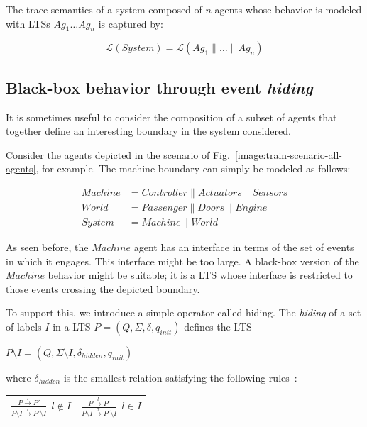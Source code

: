 The trace semantics of a system composed of $n$ agents whose behavior is modeled with LTSs $Ag_1 \ldots Ag_n$ is captured by:

\begin{equation}
\mathcal{L}(System) = \mathcal{L}(Ag_1 \parallel \ldots \parallel Ag_n)
\label{equation:system-composition}
\end{equation}


\subsection{Black-box behavior through event \emph{hiding}}

It is sometimes useful to consider the composition of a subset of agents that together define an interesting boundary in the system considered. 

Consider the agents depicted in the scenario of Fig.~\ref{image:train-scenario-all-agents}, for example. The machine boundary can simply be modeled as follows:

\vspace{-0.8cm}
\begin{align*}
Machine &= Controller \parallel Actuators \parallel Sensors \\
World   &= Passenger \parallel Doors \parallel Engine \\
System  &= Machine \parallel World
\end{align*}
\vspace{-0.8cm}

As seen before, the $Machine$ agent has an interface in terms of the set of events in which it engages. This interface might be too large. A black-box version of the $Machine$ behavior might be suitable; it is a LTS whose interface is restricted to those events crossing the depicted boundary. 

To support this, we introduce a simple operator called hiding. The \emph{hiding} of a set of labels $I$ in a LTS $P = (Q,\Sigma,\delta,q_{init})$ defines the LTS

\begin{center}
$P \setminus I = (Q,\Sigma \setminus I,\delta_{hidden},q_{init})$ 
\end{center}

\noindent where $\delta_{hidden}$ is the smallest relation satisfying the following rules~\cite{Giannakopoulou:1999}:

\begin{center}
\begin{tabular}{cc}
$\frac{\displaystyle P \stackrel{l}{\longrightarrow} P'}{\displaystyle P \setminus I \stackrel{l}{\longrightarrow} P' \setminus I}~~l \notin I$ & 
$\frac{\displaystyle P \stackrel{l}{\longrightarrow} P'}{\displaystyle P \setminus I \stackrel{\tau}{\longrightarrow} P' \setminus I}~~l \in I$ \\
\end{tabular}
\end{center}


